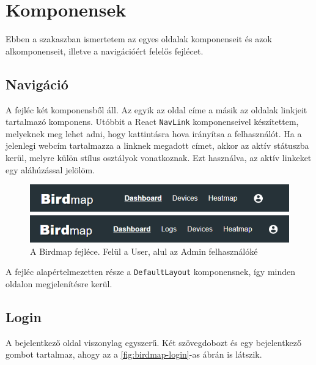 \section{Komponensek}
Ebben a szakaszban ismertetem az egyes oldalak komponenseit és azok alkomponenseit,
illetve a navigációért felelős fejlécet.
\subsection{Navigáció}
A fejléc két komponensből áll. Az egyik az oldal címe a másik az oldalak linkjeit tartalmazó komponens.
Utóbbit a React \verb+NavLink+ komponenseivel készítettem, melyeknek meg lehet adni, hogy kattintásra hova irányítsa a felhasználót.
Ha a jelenlegi webcím tartalmazza a linknek megadott címet, akkor az aktív státuszba kerül, melyre külön stílus osztályok vonatkoznak.
Ezt használva, az aktív linkeket egy aláhúzással jelölöm. 

\begin{figure}[!ht]
    \centering
    \includegraphics[width=150mm, keepaspectratio]{figures/appbar-user-admin.png}
    \caption{A Birdmap fejléce. Felül a User, alul az Admin felhasználóké}
    \label{fig:birdmap-appbar}
\end{figure}

A fejléc alapértelmezetten része a \verb+DefaultLayout+ komponensnek, így minden oldalon megjelenítésre kerül.

\subsection{Login}
A bejelentkező oldal viszonylag egyszerű. Két szövegdobozt és egy bejelentkező gombot tartalmaz, ahogy az a \ref{fig:birdmap-login}-as ábrán is látszik.

